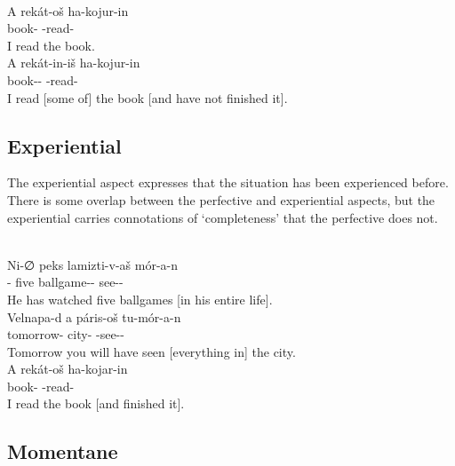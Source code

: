 \documentclass[grammar]{subfiles}
\begin{document}
\begin{exe}
  \ex {}\\
  \gll A rekát-oš ha-kojur-in\\
  {\Def} book-{\Acc} {\Fsg}-read\bs{\Perf}-{\AgtT}\\
  \glt I read the book.
  \ex {}\\
  \gll A rekát-in-iš ha-kojur-in\\
  {\Def} book-{\Part}-{\Acc} {\Fsg}-read\bs{\Perf}-{\AgtT}\\
  \glt I read [some of] the book [and have not finished it].
\end{exe}


\subsection{Experiential}
\label{vp:ssec_experiential}

The experiential aspect expresses that the situation has been experienced
before.  There is some overlap between the perfective and experiential aspects,
but the experiential carries connotations of ‘completeness’ that the perfective
does not.   

\begin{exe}
  \ex {}\\
  \gll Ni-∅ peks lamizti-v-aš mór-a-n\\ 
  {\Tsg}-{\Dir} five ballgame-{\Du}-{\Acc} see-{\Exp}-{\AgtT}\\
  \glt He has watched five ballgames [in his entire life].
  \ex {}\\
  \gll Velnapa-d a páris-oš tu-mór-a-n\\
  tomorrow-{\Ess} {\Def} city-{\Acc} {\Ssg}-see-{\Exp}-{\AgtT}\\
  \glt Tomorrow you will have seen [everything in] the city.
  \ex {}\\
  \gll A rekát-oš ha-kojar-in\\
  {\Def} book-{\Acc} {\Fsg}-read\bs{\Exp}-{\AgtT}\\
  \glt I read the book [and finished it].
\end{exe}


\subsection{Momentane}
\label{vp:ssec_momentane}
\end{document}
